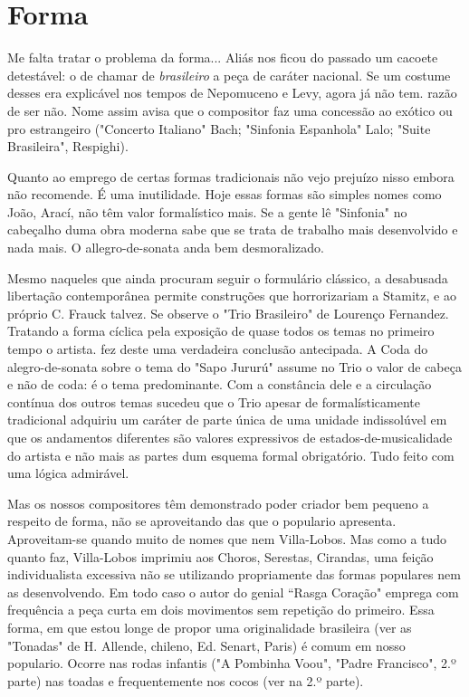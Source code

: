 \section{Forma}

Me falta tratar o problema da forma... Aliás nos ficou do passado um
cacoete detestável: o de chamar de \emph{brasileiro} a peça de caráter
nacional. Se um costume desses era explicável nos tempos de Nepomuceno e
Levy, agora já não tem. razão de ser não. Nome assim avisa que o
compositor faz uma concessão ao exótico ou pro estrangeiro ("Concerto
Italiano" Bach; "Sinfonia Espanhola" Lalo; "Suite Brasileira",
Respighi).

Quanto ao emprego de certas formas tradicionais não vejo prejuízo nisso
embora não recomende. É uma inutilidade. Hoje essas formas são simples
nomes como João, Arací, não têm valor formalístico mais. Se a gente lê
"Sinfonia" no cabeçalho duma obra moderna sabe que se trata de trabalho
mais desenvolvido e nada mais. O allegro-de-sonata anda bem
desmoralizado.

Mesmo naqueles que ainda procuram seguir o formulário clássico, a
desabusada libertação contemporânea permite construções que
horrorizariam a Stamitz, e ao próprio C. Frauck talvez. Se observe o
"Trio Brasileiro" de Lourenço Fernandez. Tratando a forma cíclica pela
exposição de quase todos os temas no primeiro tempo o artista. fez deste
uma verdadeira conclusão antecipada. A Coda do alegro-de-sonata sobre o
tema do "Sapo Jururú" assume no Trio o valor de cabeça e não de coda: é
o tema predominante. Com a constância dele e a circulação contínua dos
outros temas sucedeu que o Trio apesar de formalísticamente tradicional
adquiriu um caráter de parte única de uma unidade indissolúvel em que os
andamentos diferentes são valores expressivos de estados-de-musicalidade
do artista e não mais as partes dum esquema formal obrigatório. Tudo
feito com uma lógica admirável.~

Mas os nossos compositores têm demonstrado poder criador bem pequeno a
respeito de forma, não se aproveitando das que o populario apresenta.
Aproveitam-se quando muito de nomes que nem Villa-Lobos. Mas como a tudo
quanto faz, Villa-Lobos imprimiu aos Choros, Serestas, Cirandas, uma
feição individualista excessiva não se utilizando propriamente das
formas populares nem as desenvolvendo. Em todo caso o autor do genial
``Rasga Coração" emprega com frequência a peça curta em dois movimentos
sem repetição do primeiro. Essa forma, em que estou longe de propor uma
originalidade brasileira (ver as "Tonadas" de H. Allende, chileno, Ed.
Senart, Paris) é comum em nosso populario. Ocorre nas rodas infantis ("A
Pombinha Voou", "Padre Francisco", 2.º parte) nas toadas e
frequentemente nos cocos (ver na 2.º parte).


